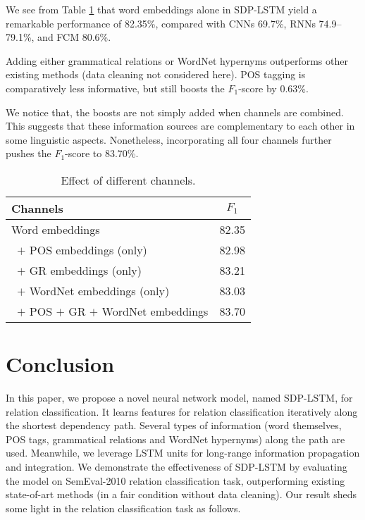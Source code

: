 \documentclass[11pt,a4paper]{article}
\begin{document}
We see from Table \ref{tChannel} that word embeddings alone in SDP-LSTM
yield a remarkable performance of 82.35\%,
compared with CNNs 69.7\%, RNNs 74.9--79.1\%, and FCM 80.6\%.

Adding either grammatical relations or WordNet hypernyms
outperforms other existing methods (data cleaning not considered here).
POS tagging is comparatively less informative, but
still boosts the $F_1$-score by 0.63\%.

We notice that, the boosts are not simply added
when channels are combined. This suggests that these
information sources are complementary to each other in some linguistic aspects.
Nonetheless, incorporating all four channels further
pushes the $F_1$-score to 83.70\%.


\begin{table}[!t]
\centering
\vspace{-.2cm}
\begin{tabular}{lc}
\hline
\hline
\textbf{Channels}  & $F_1$ \\
\hline
Word embeddings     & 82.35  \\
\ $+$ POS embeddings (only)   & 82.98  \\
\ $+$ GR embeddings  (only)   & 83.21   \\
\ $+$ WordNet embeddings (only)    & 83.03\\
\ $+$ POS $+$ GR $+$ WordNet embeddings & 83.70\\
\hline
\hline
\end{tabular}
\caption{Effect of different channels.}\label{tChannel}
\vspace{-.3cm}
\end{table}

\section{Conclusion}\label{sConclusion}
In this paper, we propose a novel neural network model, named SDP-LSTM, for relation classification.
It learns features for relation classification iteratively along the shortest dependency path.
Several types of information (word themselves, POS tags, grammatical relations and WordNet hypernyms) along the path are used.
Meanwhile, we leverage LSTM units for long-range information propagation and integration.
We demonstrate the effectiveness of SDP-LSTM by evaluating the model on SemEval-2010 relation classification task, outperforming 
existing state-of-art methods (in a fair condition without data cleaning).
Our result sheds some light in the relation classification task as follows.
\end{document}
